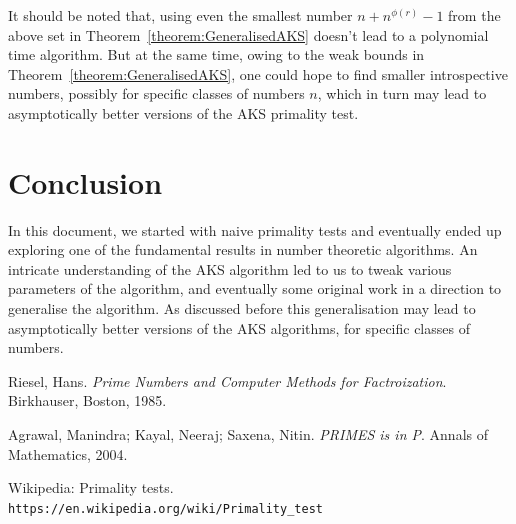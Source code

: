 \documentclass[11pt]{report}
\begin{document}
It should be noted that, using even the smallest number $n + n^{\phi(r)} - 1$ from the above set in Theorem~\ref{theorem:GeneralisedAKS} doesn't lead to a polynomial time algorithm. But at the same time, owing to the weak bounds in Theorem~\ref{theorem:GeneralisedAKS}, one could hope to find smaller introspective numbers, possibly for specific classes of numbers $n$, which in turn may lead to asymptotically better versions of the AKS primality test.

\chapter{Conclusion}
In this document, we started with naive primality tests and eventually ended up exploring one of the fundamental results in number theoretic algorithms. An intricate understanding of the AKS algorithm led to us to tweak various parameters of the algorithm, and eventually some original work in a direction to generalise the algorithm. As discussed before this generalisation may lead to asymptotically better versions of the AKS algorithms, for specific classes of numbers.

\begin{thebibliography}{9}
Riesel, Hans. 
\textit{Prime Numbers and Computer Methods for Factroization}. Birkhauser, Boston, 1985.
 
Agrawal, Manindra; Kayal, Neeraj; Saxena, Nitin. \textit{PRIMES is in P}. Annals of Mathematics, 2004.

Wikipedia: Primality tests.
\\\texttt{https://en.wikipedia.org/wiki/Primality\_test}
\end{thebibliography}
\end{document}
